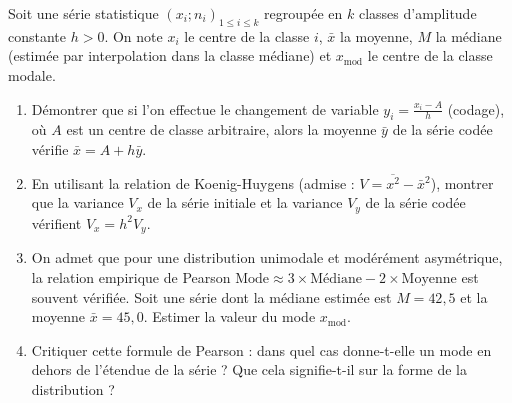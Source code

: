 \documentclass[11pt]{article}
\begin{document}
\begin{exercice}
Soit une série statistique $(x_i ; n_i)_{1 \le i \le k}$ regroupée en $k$ classes d'amplitude constante $h > 0$. On note $x_i$ le centre de la classe $i$, $\bar{x}$ la moyenne, $M$ la médiane (estimée par interpolation dans la classe médiane) et $x_{\text{mod}}$ le centre de la classe modale.

\begin{enumerate}
    \item Démontrer que si l'on effectue le changement de variable $y_i = \frac{x_i - A}{h}$ (codage), où $A$ est un centre de classe arbitraire, alors la moyenne $\bar{y}$ de la série codée vérifie $\bar{x} = A + h\bar{y}$.
    \item En utilisant la relation de Koenig-Huygens (admise : $V = \overline{x^2} - \bar{x}^2$), montrer que la variance $V_x$ de la série initiale et la variance $V_y$ de la série codée vérifient $V_x = h^2 V_y$.
    \item On admet que pour une distribution unimodale et modérément asymétrique, la relation empirique de Pearson $\text{Mode} \approx 3 \times \text{Médiane} - 2 \times \text{Moyenne}$ est souvent vérifiée.
    Soit une série dont la médiane estimée est $M = 42,5$ et la moyenne $\bar{x} = 45,0$. Estimer la valeur du mode $x_{\text{mod}}$.
    \item Critiquer cette formule de Pearson : dans quel cas donne-t-elle un mode en dehors de l'étendue de la série ? Que cela signifie-t-il sur la forme de la distribution ?
\end{enumerate}
\end{exercice}
\end{document}
